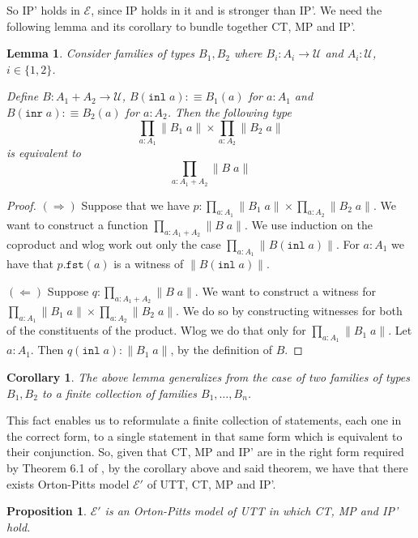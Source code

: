 \documentclass[12pt]{report}
\newtheorem{lem}[thm]{Lemma}
\newtheorem{cor}[thm]{Corollary}
\newtheorem{prop}[thm]{Proposition}
\theoremstyle{definition}
\begin{document}
So IP' holds in $\mathcal{E}$, since IP holds in it and is stronger than IP'. 
We need the following lemma and its corollary to bundle together CT, MP and IP'. 
\begin{lem}
Consider families of types $B_1, B_2$ where $B_i : A_i \rightarrow \mathcal{U}$ and $A_i : \mathcal{U}$, $i \in \{1,2\}$. 

Define $B : A_1 +A_2 \rightarrow \mathcal{U}$, $B(\mathtt{inl}\; a) :\equiv  B_1(a)$ for $a : A_1$ and $B(\mathtt{inr}\; a) :\equiv  B_2(a)$ for $a : A_2$. 
Then the following type
$$\prod_{a : A_1}\lVert B_1\; a\rVert \times \prod_{a : A_2}\lVert B_2\;a \rVert$$
is equivalent to
$$\prod_{a : A_1 + A_2} \lVert B\; a \rVert$$
\end{lem}
\begin{proof}
$(\Rightarrow )$ Suppose that we have $p : \prod_{a : A_1}\lVert B_1\; a\rVert \times \prod_{a : A_2}\lVert B_2\;a \rVert$. 
We want to construct a function $\prod_{a : A_1 + A_2} \lVert B\; a \rVert$. 
We use induction on the coproduct and wlog work out only the case $\prod_{a : A_1} \lVert B(\mathtt{inl}\; a)\rVert$. 
For $a : A_1$ we have that $p.\mathtt{fst}(a)$ is a witness of $\lVert B(\mathtt{inl}\; a) \rVert$.

$(\Leftarrow) $ Suppose $q : \prod_{a : A_1 + A_2} \lVert B\; a \rVert$. 
We want to construct a witness for $\prod_{a : A_1}\lVert B_1\; a\rVert \times \prod_{a : A_2}\lVert B_2\;a \rVert$. 
We do so by constructing witnesses for both of the constituents of the product. 
Wlog we do that only for $\prod_{a : A_1}\lVert B_1\; a\rVert$. 
Let $a : A_1$. Then $q(\mathtt{inl}\; a) : \lVert B_1\; a \rVert$, by the definition of $B$.
\end{proof}
\begin{cor}
The above lemma generalizes from the case of two families of types $B_1, B_2$ to a finite collection of families $B_1,\ldots,B_n$. 
\end{cor}
This fact enables us to reformulate a finite collection of statements, each one in the correct form, to a single statement in that same form which is equivalent to their conjunction. 
So, given that CT, MP and IP' are in the right form required by Theorem 6.1 of \cite{1905.03014}, by the corollary above and said theorem, we have that there exists Orton-Pitts model $\mathcal{E}'$ of UTT, CT, MP and IP'.
\begin{prop}\label{EPrime}
$\mathcal{E}'$ is an Orton-Pitts model of UTT in which CT, MP and IP' hold.
\end{prop}
\end{document}
